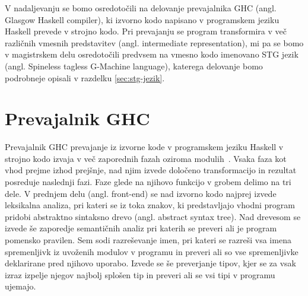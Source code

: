 V nadaljevanju se bomo osredotočili na delovanje prevajalnika GHC (angl. Glasgow Haskell compiler), ki izvorno kodo napisano v programskem jeziku Haskell prevede v strojno kodo. Pri prevajanju se program transformira v več različnih vmesnih predstavitev (angl. intermediate representation), mi pa se bomo v magistrskem delu osredotočili predvsem na vmesno kodo imenovano STG jezik (angl. Spineless tagless G-Machine language), katerega delovanje bomo podrobneje opisali v razdelku \ref{sec:stg-jezik}.


\section{Prevajalnik GHC}
\label{sec:prevajalnik-ghc}

Prevajalnik GHC prevajanje iz izvorne kode v programskem jeziku Haskell v strojno kodo izvaja v več zaporednih fazah oziroma modulih~\cite{jones1993glasgow, brown2012architecture}. Vsaka faza kot vhod prejme izhod prejšnje, nad njim izvede določeno transformacijo in rezultat posreduje naslednji fazi. Faze glede na njihovo funkcijo v grobem delimo na tri dele. V prednjem delu (angl. front-end) se nad izvorno kodo najprej izvede leksikalna analiza, pri kateri se iz toka znakov, ki predstavljajo vhodni program pridobi abstraktno sintaksno drevo (angl. abstract syntax tree). Nad drevesom se izvede še zaporedje semantičnih analiz pri katerih se preveri ali je program pomensko pravilen. Sem sodi razreševanje imen, pri kateri se razreši vsa imena spremenljivk iz uvoženih modulov v programu in preveri ali so vse spremenljivke deklarirane pred njihovo uporabo. Izvede se še preverjanje tipov, kjer se za vsak izraz izpelje njegov najbolj splošen tip in preveri ali se vsi tipi v programu ujemajo.

